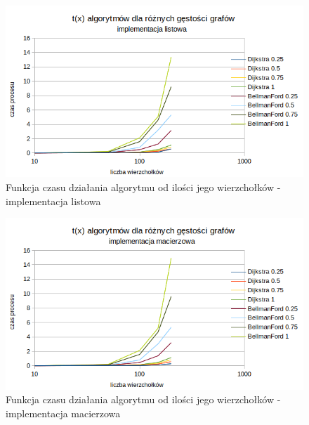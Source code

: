 \documentclass[10pt,a4paper]{article} %
\begin{document}
	\begin{figure}[!ht]
		\centering %
		\includegraphics[scale = 0.9]{dijstra_bellman_lista.png} %
		\caption{Funkcja czasu działania algorytmu od ilości jego wierzchołków - implementacja listowa} %
		\label{fig:Obraz2} %
	\end{figure}
	\begin{figure}[!ht]
		\centering %
		\includegraphics[scale = 0.9]{dijstra_bellman_macierz.png} %
		\caption{Funkcja czasu działania algorytmu od ilości jego wierzchołków - implementacja macierzowa} %
		\label{fig:Obraz3} %
	\end{figure}
	
	\clearpage
	
\end{document}
